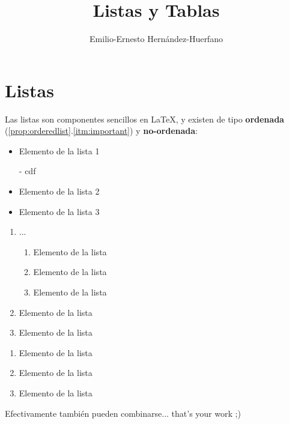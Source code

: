 \documentclass[12pt,letterpaper,oneside]{article}
\title{Listas y Tablas}
\author{Emilio-Ernesto Hernández-Huerfano}
\begin{document}
\maketitle

\section{Listas}

\noindent Las listas son componentes sencillos en \LaTeX, y existen de tipo \textbf{ordenada} (\ref{prop:orderedlist}.\ref{itm:important}) y \textbf{no-ordenada}:

\begin{multicols}{3}

\begin{itemize} \label{prop:unorderedlist}
	\item Elemento de la lista 1
	\item[-] cdf
	\item Elemento de la lista 2
	\item Elemento de la lista 3
\end{itemize}

\columnbreak

\begin{enumerate} \label{prop:orderedlist}
	\item ...
	\begin{enumerate} \label{prop:orderedlist}
	\item Elemento de la lista
	\item\label{itm:important} Elemento de la lista
	\item Elemento de la lista
	\end{enumerate}
	\item\label{itm:important} Elemento de la lista
	\item Elemento de la lista
\end{enumerate}

\columnbreak

\begin{enumerate} \label{prop:orderedlist}
	\item Elemento de la lista
	\item\label{itm:important} Elemento de la lista
	\item Elemento de la lista
\end{enumerate}

\end{multicols}

Efectivamente también pueden combinarse... that's your work ;)
\end{document}
